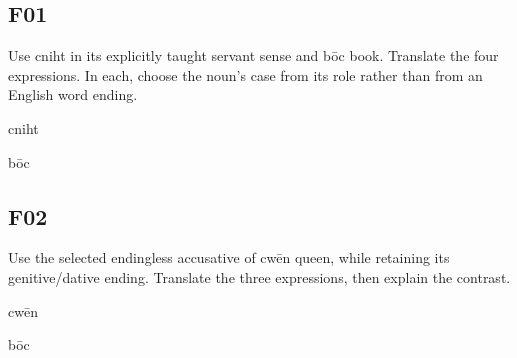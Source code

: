 \subsection*{F01}

Use cniht in its explicitly taught servant sense and bōc book. Translate the four expressions. In each, choose the noun's case from its role rather than from an English word ending.

cniht

bōc





\subsection*{F02}

Use the selected endingless accusative of cwēn queen, while retaining its genitive/\allowbreak{}dative ending. Translate the three expressions, then explain the contrast.

cwēn

bōc




